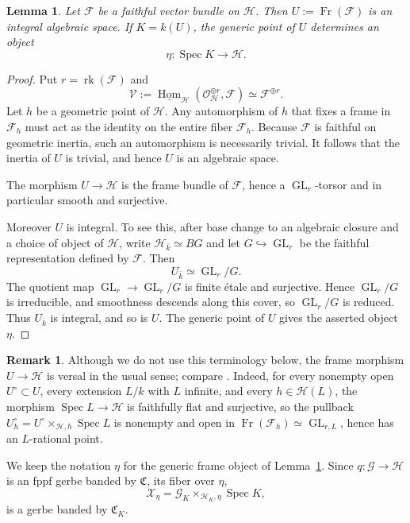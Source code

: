 \documentclass[11pt,reqno]{amsart}
\numberwithin{equation}{section}
\theoremstyle{plain}
\newtheorem{lemm}[prop]{Lemma}
\theoremstyle{definition}
\newtheorem{rema}[prop]{Remark}
\def\cG{{\mathcal G}}
\def\cH{{\mathcal H}}
\def\cX{{\mathcal X}}
\def\fC{{\mathfrak C}}
\def\rk{{\operatorname{rk}}}
\def\Spec{{\operatorname{Spec}}}
\def\ra{{\rightarrow}}
\def\GL{{\operatorname{GL}}}
\begin{document}
\begin{lemm}\label{lem:generic-object-rigidification}
Let $\mathcal F$ be a faithful vector bundle on $\cH$.  Then
$U:=\operatorname{Fr}(\mathcal F)$ is an integral algebraic space.  If
$K=k(U)$, the generic point of $U$ determines an object
\[
\eta:\Spec K\ra\cH.
\]
\end{lemm}

\begin{proof}
Put $r=\rk(\mathcal F)$ and
\[
\mathcal V:=\underline{\operatorname{Hom}}_{\cH}
(\mathcal O_{\cH}^{\oplus r},\mathcal F)
\simeq \mathcal F^{\oplus r}.
\]
Let $h$ be a geometric point of $\cH$. Any automorphism of $h$ that fixes a frame in $\mathcal F_h$ must act as the identity on the entire fiber $\mathcal F_h$. Because $\mathcal F$ is faithful on geometric inertia, such an automorphism is necessarily trivial. It follows that the inertia of $U$ is trivial, and hence $U$ is an algebraic space.

The morphism $U\to\cH$ is the frame bundle of $\mathcal F$, hence a
$\GL_r$-torsor and in particular smooth and surjective.  

Moreover $U$ is integral. To see this, after base change to an algebraic closure and a choice of object of $\cH$, write $\cH_{\bar k}\simeq BG$ and let
$G\hookrightarrow\GL_r$ be the faithful representation defined by
$\mathcal F$.  Then
\[
U_{\bar k}\simeq \GL_r/G.
\]
The quotient map $\GL_r\to\GL_r/G$ is finite \'{e}tale and surjective.
Hence $\GL_r/G$ is irreducible, and smoothness descends along this cover, so
$\GL_r/G$ is reduced.  Thus $U_{\bar k}$ is integral, and so is $U$.
The generic point of $U$ gives the asserted object $\eta$.
\end{proof}

\begin{rema}
Although we do not use this terminology below, the frame morphism
$U\to\cH$ is versal in the usual sense; compare
\cite[\S 1]{DuncanReichstein2015}.  Indeed, for every nonempty open
$U^\circ\subset U$, every extension $L/k$ with $L$ infinite, and every
$h\in\cH(L)$, the morphism $\Spec L\to\cH$ is faithfully flat and surjective, so the
pullback $U_h^\circ=U^\circ\times_{\cH,h}\Spec L$ is nonempty and open in
$\operatorname{Fr}(\mathcal F_h)\simeq\GL_{r,L}$, hence has an
$L$-rational point.
\end{rema}

We keep the notation $\eta$ for the generic frame object of
Lemma~\ref{lem:generic-object-rigidification}. Since
$q:\cG\to\cH$ is an fppf gerbe banded by $\fC$, its fiber over $\eta$,
\[
\cX_\eta=\cG_K\times_{\cH_K,\eta}\Spec K,
\]
is a gerbe banded by $\fC_K$.
\end{document}
